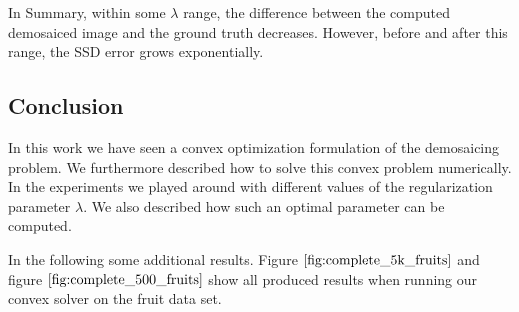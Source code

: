 \documentclass{paper}
\begin{document}
In Summary, within some $\lambda$ range, the difference between the computed demosaiced image and the ground truth decreases. However, before and after this range, the SSD error grows exponentially.

\subsection{Conclusion}
In this work we have seen a convex optimization formulation of the demosaicing problem. We furthermore described how to solve this convex problem numerically. In the experiments we played around with different values of the regularization parameter $\lambda$. We also described how such an optimal parameter can be computed. 

In the following some additional results. Figure $\ref{fig:complete_5k_fruits}$ and figure $\ref{fig:complete_500_fruits}$ show all produced results when running our convex solver on the fruit data set.
\end{document}
